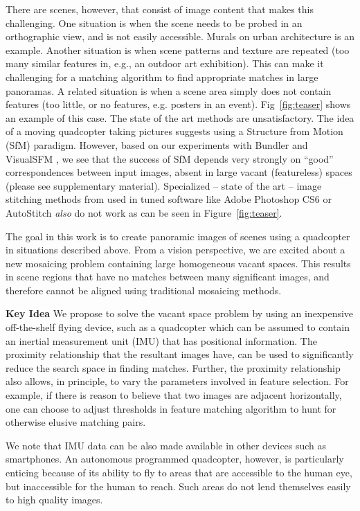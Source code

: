 There are scenes, however, that consist of image content that makes
this challenging.  One situation is when the scene needs to be probed
in an orthographic view, and is not easily accessible.  Murals on
urban architecture is an example. Another situation is when scene
patterns and texture are repeated (too many similar features in, e.g.,
an outdoor art exhibition).  This can make it challenging for a
matching algorithm to find appropriate matches in large panoramas.  A
related situation is when a scene area simply does not contain
features (too little, or no features, e.g. posters in an event).
Fig~\ref{fig:teaser} shows an example of this case.  The state of the
art methods are unsatisfactory.  The idea of a moving quadcopter
taking pictures suggests using a Structure from Motion (SfM) paradigm.
However, based on our experiments with Bundler\cite{Snavely06,
  Snavely07} and VisualSFM \cite{Wu13}, we see that the success of SfM
depends very strongly on ``good'' correspondences between input
images, absent in large vacant (featureless) spaces (please see supplementary 
material).  Specialized -- state of the art -- image stitching 
methods from \cite{Brown03, Brown05} used in tuned software like Adobe 
Photoshop CS6 or AutoStitch \emph{also} do not work as can be seen 
in Figure~\ref{fig:teaser}.


The goal in this work is to create panoramic images of scenes using a
quadcopter in situations described above. From a vision perspective,
we are excited about a new mosaicing problem containing large
homogeneous vacant spaces.  This results in scene regions that have no
matches between many significant images, and therefore cannot be
aligned using traditional mosaicing methods.


{\bf Key Idea} We propose to solve the vacant space problem by using
an inexpensive off-the-shelf flying device, such as a quadcopter which
can be assumed to contain an inertial measurement unit (IMU) that has
positional information.  The proximity relationship that the resultant
images have, can be used to significantly reduce the search space in
finding matches.  Further, the proximity relationship also allows, in
principle, to vary the parameters involved in feature selection. For
example, if there is reason to believe that two images are adjacent
horizontally, one can choose to adjust thresholds in feature matching
algorithm to hunt for otherwise elusive matching pairs.

We note that IMU data can be also made available in other devices such
as smartphones.  An autonomous programmed quadcopter, however, is
particularly enticing because of its ability to fly to areas that are
accessible to the human eye, but inaccessible for the human to
reach. Such areas do not lend themselves easily to high quality
images. 

